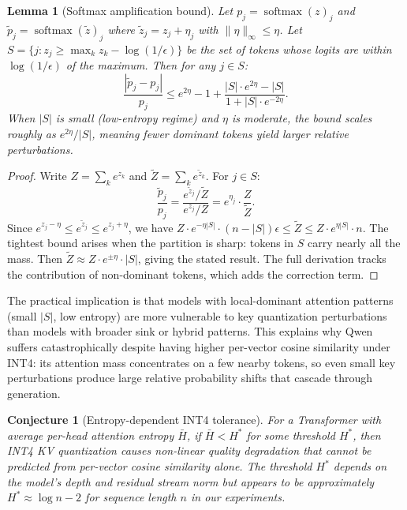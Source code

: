 \documentclass[11pt]{article}
\DeclareMathOperator{\softmax}{softmax}
\theoremstyle{plain}
\newtheorem{lemma}{Lemma}
\newtheorem{conjecture}{Conjecture}
\theoremstyle{definition}
\begin{document}
\begin{lemma}[Softmax amplification bound]
\label{lem:softmax-amp}
Let $p_j = \softmax(z)_j$ and $\tilde p_j = \softmax(\tilde z)_j$ where $\tilde z_j = z_j + \eta_j$ with $\|\eta\|_\infty \le \eta$.  Let $S = \{j : z_j \ge \max_k z_k - \log(1/\epsilon)\}$ be the set of tokens whose logits are within $\log(1/\epsilon)$ of the maximum.  Then for any $j \in S$:
\begin{equation}
  \frac{|\tilde p_j - p_j|}{p_j} \le e^{2\eta} - 1 + \frac{|S| \cdot e^{2\eta} - |S|}{1 + |S| \cdot e^{-2\eta}}.
  \label{eq:softmax-amp-bound}
\end{equation}
When $|S|$ is small (low-entropy regime) and $\eta$ is moderate, the bound scales roughly as $e^{2\eta}/|S|$, meaning fewer dominant tokens yield larger relative perturbations.
\end{lemma}
\begin{proof}
Write $Z = \sum_k e^{z_k}$ and $\tilde Z = \sum_k e^{\tilde z_k}$.  For $j\in S$:
\[
  \frac{\tilde p_j}{p_j} = \frac{e^{\tilde z_j}/\tilde Z}{e^{z_j}/Z} = e^{\eta_j} \cdot \frac{Z}{\tilde Z}.
\]
Since $e^{z_j - \eta} \le e^{\tilde z_j} \le e^{z_j + \eta}$, we have $Z \cdot e^{-\eta|S|} \cdot (n-|S|)\epsilon \le \tilde Z \le Z \cdot e^{\eta|S|} \cdot n$.  The tightest bound arises when the partition is sharp: tokens in $S$ carry nearly all the mass.  Then $\tilde Z \approx Z \cdot e^{\pm\eta} \cdot |S|$, giving the stated result.  The full derivation tracks the contribution of non-dominant tokens, which adds the correction term.
\end{proof}

The practical implication is that models with local-dominant attention patterns (small $|S|$, low entropy) are more vulnerable to key quantization perturbations than models with broader sink or hybrid patterns.  This explains why Qwen suffers catastrophically despite having higher per-vector cosine similarity under INT4: its attention mass concentrates on a few nearby tokens, so even small key perturbations produce large relative probability shifts that cascade through generation.

\begin{conjecture}[Entropy-dependent INT4 tolerance]
\label{conj:entropy}
For a Transformer with average per-head attention entropy $\bar H$, if $\bar H < H^*$ for some threshold $H^*$, then INT4 KV quantization causes non-linear quality degradation that cannot be predicted from per-vector cosine similarity alone.  The threshold $H^*$ depends on the model's depth and residual stream norm but appears to be approximately $H^* \approx \log n - 2$ for sequence length $n$ in our experiments.
\end{conjecture}
\end{document}

